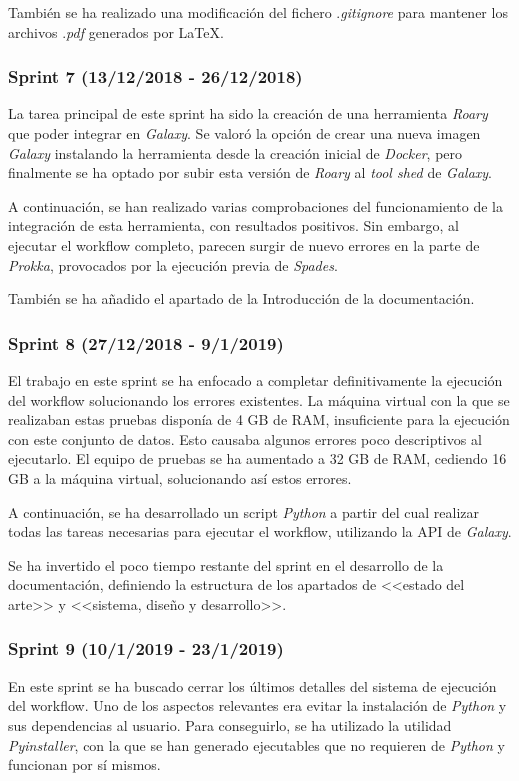 También se ha realizado una modificación del fichero .\textit{gitignore} para mantener los archivos .\textit{pdf} generados por \LaTeX.

\subsubsection{Sprint 7 (13/12/2018 - 26/12/2018)}
La tarea principal de este sprint ha sido la creación de una herramienta \textit{Roary} que poder integrar en \textit{Galaxy}. Se valoró la opción de crear una nueva imagen \textit{Galaxy} instalando la herramienta desde la creación inicial de \textit{Docker}, pero finalmente se ha optado por subir esta versión de \textit{Roary} al \emph{tool shed} de \textit{Galaxy}.

A continuación, se han realizado varias comprobaciones del funcionamiento de la integración de esta herramienta, con resultados positivos. Sin embargo, al ejecutar el workflow completo, parecen surgir de nuevo errores en la parte de \textit{Prokka}, provocados por la ejecución previa de \textit{Spades}. 

También se ha añadido el apartado de la Introducción de la documentación.

\subsubsection{Sprint 8 (27/12/2018 - 9/1/2019)}
El trabajo en este sprint se ha enfocado a completar definitivamente la ejecución del workflow solucionando los errores existentes. La máquina virtual con la que se realizaban estas pruebas disponía de 4 GB de RAM, insuficiente para la ejecución con este conjunto de datos. Esto causaba algunos errores poco descriptivos al ejecutarlo. El equipo de pruebas se ha aumentado a 32 GB de RAM, cediendo 16 GB a la máquina virtual, solucionando así estos errores.

A continuación, se ha desarrollado un script \textit{Python} a partir del cual realizar todas las tareas necesarias para ejecutar el workflow, utilizando la API de \textit{Galaxy}.

Se ha invertido el poco tiempo restante del sprint en el desarrollo de la documentación, definiendo la estructura de los apartados de <<estado del arte>> y <<sistema, diseño y desarrollo>>.

\subsubsection{Sprint 9 (10/1/2019 - 23/1/2019)}
En este sprint se ha buscado cerrar los últimos detalles del sistema de ejecución del workflow. Uno de los aspectos relevantes era evitar la instalación de \textit{Python} y sus dependencias al usuario. Para conseguirlo, se ha utilizado la utilidad \textit{Pyinstaller}, con la que se han generado ejecutables que no requieren de \textit{Python} y funcionan por sí mismos. 

